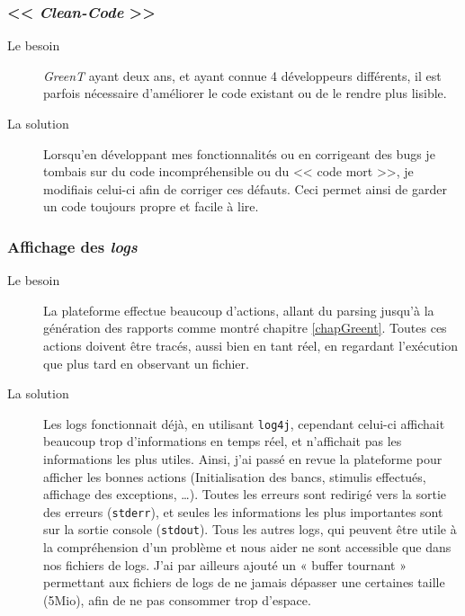 	\subsubsection{<< \textit{Clean-Code} >>}
		\begin{description}
			\item[Le besoin] \textit{GreenT} ayant deux ans, et ayant connue 4 développeurs différents, il est parfois nécessaire d'améliorer le code existant ou de le rendre plus lisible. 
			\item[La solution] Lorsqu'en développant mes fonctionnalités ou en corrigeant des bugs je tombais sur du code incompréhensible ou du << code mort >>, je modifiais celui-ci afin de corriger ces défauts. Ceci permet ainsi de garder un code toujours propre et facile à lire.
		\end{description}
		
	\subsubsection{Affichage des \textit{logs}}
		\begin{description}
			\item[Le besoin] La plateforme effectue beaucoup d'actions, allant du parsing jusqu'à la génération des rapports comme montré chapitre \ref{chapGreent}. Toutes ces actions doivent être tracés, aussi bien en tant réel, en regardant l'exécution que plus tard en observant un fichier.
			\item[La solution] Les logs fonctionnait déjà, en utilisant \texttt{log4j}, cependant celui-ci affichait beaucoup trop d'informations en temps réel, et n'affichait pas les informations les plus utiles. Ainsi, j'ai passé en revue la plateforme pour afficher les bonnes actions (Initialisation des bancs, stimulis effectués, affichage des exceptions, \ldots). Toutes les erreurs sont redirigé vers la sortie des erreurs (\texttt{stderr}), et seules les informations les plus importantes sont sur la sortie console (\texttt{stdout}). Tous les autres logs, qui peuvent être utile à la compréhension d'un problème et nous aider ne sont accessible que dans nos fichiers de logs. J'ai par ailleurs ajouté un « buffer tournant » permettant aux fichiers de logs de ne jamais dépasser une certaines taille (5Mio), afin de ne pas consommer trop d'espace.
		\end{description}
		

